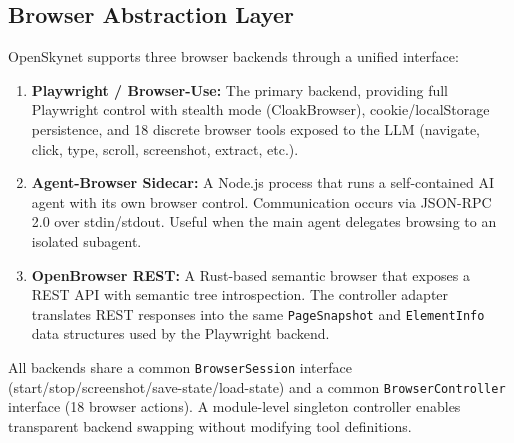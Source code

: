 \subsection{Browser Abstraction Layer}

OpenSkynet supports three browser backends through a unified interface:

\begin{enumerate}[leftmargin=*,itemsep=1pt]
    \item \textbf{Playwright / Browser-Use:} The primary backend, providing full Playwright control with stealth mode (CloakBrowser), cookie/localStorage persistence, and 18 discrete browser tools exposed to the LLM (navigate, click, type, scroll, screenshot, extract, etc.).
    \item \textbf{Agent-Browser Sidecar:} A Node.js process that runs a self-contained AI agent with its own browser control. Communication occurs via JSON-RPC 2.0 over stdin/stdout. Useful when the main agent delegates browsing to an isolated subagent.
    \item \textbf{OpenBrowser REST:} A Rust-based semantic browser that exposes a REST API with semantic tree introspection. The controller adapter translates REST responses into the same \texttt{PageSnapshot} and \texttt{ElementInfo} data structures used by the Playwright backend.
\end{enumerate}

All backends share a common \texttt{BrowserSession} interface (start/stop/screenshot/save-state/load-state) and a common \texttt{BrowserController} interface (18 browser actions). A module-level singleton controller enables transparent backend swapping without modifying tool definitions.
